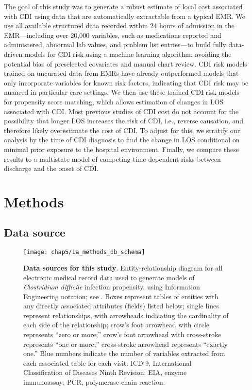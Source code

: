 The goal of this study was to generate a robust estimate of local cost associated with CDI using data that are automatically extractable from a typical EMR. We use all available structured data recorded within 24 hours of admission in the EMR—including over 20,000 variables, such as medications reported and administered, abnormal lab values, and problem list entries—to build fully data-driven models for CDI risk using a machine learning algorithm, avoiding the potential bias of preselected covariates and manual chart review. CDI risk models trained on uncurated data from EMRs have already outperformed models that only incorporate variables for known risk factors, indicating that CDI risk may be nuanced in particular care settings.\autocite{Wiens2014} We then use these trained CDI risk models for propensity score matching, which allows estimation of changes in LOS associated with CDI. Most previous studies of CDI cost do not account for the possibility that longer LOS increases the risk of CDI, i.e., reverse causation, and therefore likely overestimate the cost of CDI.\autocite{Mitchell2014,Stevens2015} To adjust for this, we stratify our analysis by the time of CDI diagnosis to find the change in LOS conditional on minimal prior exposure to the hospital environment. Finally, we compare these results to a multistate model of competing time-dependent risks between discharge and the onset of CDI.

\section{Methods}

\subsection{Data source}

\begin{figure}[htb]
  \texttt{[image: chap5/1a\_methods\_db\_schema]}               
  \caption[Data sources for study of \emph{C. difficile} infection costs]{\textbf{Data sources for this study}. Entity-relationship diagram for all electronic medical record data used to generate models of \emph{Clostridium difficile} infection propensity, using Information Engineering notation; see \textcite{Halpin2010}. Boxes represent tables of entities with any directly associated attributes (fields) listed below; single lines represent relationships, with arrowheads indicating the cardinality of each side of the relationship; crow’s foot arrowhead with circle represents “zero or more;” crow’s foot arrowhead with cross-stroke represents “one or more;” cross-stroke arrowhead represents “exactly one.” Blue numbers indicate the number of variables extracted from each associated table for each visit. ICD-9, International Classification of Diseases Ninth Revision; EIA, enzyme immunoassay; PCR, polymerase chain reaction.}
  \label{fig:db_schema}
\end{figure}

